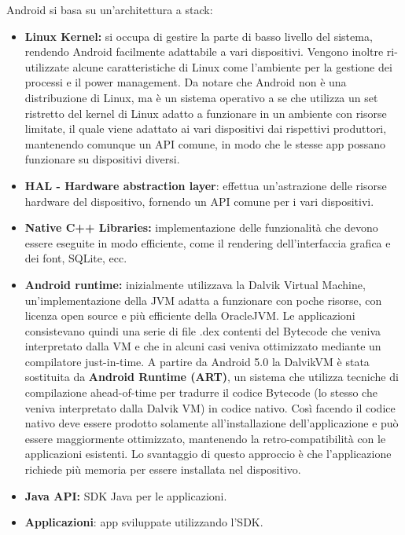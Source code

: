 Android si basa su un'architettura a stack:

\begin{itemize}
	\item \textbf{Linux Kernel:} si occupa di gestire la parte di basso livello
		del sistema, rendendo Android facilmente adattabile a vari
		dispositivi. Vengono inoltre ri-utilizzate alcune caratteristiche di
		Linux come l'ambiente per la gestione dei processi e il power
		management. Da notare che Android non è una distribuzione di Linux, ma
		è un sistema operativo a se che utilizza un set ristretto del kernel
		di Linux adatto a funzionare in un ambiente con risorse limitate, il
		quale viene adattato ai vari dispositivi dai rispettivi produttori,
		mantenendo comunque un API comune, in modo che le stesse app possano
		funzionare su dispositivi diversi.
	\item
		\textbf{HAL - Hardware abstraction layer}: effettua un'astrazione
		delle risorse hardware del dispositivo, fornendo un API comune per i
		vari dispositivi.
	\item
		\textbf{Native C++ Libraries:} implementazione delle funzionalità che
		devono essere eseguite in modo efficiente, come il rendering
		dell'interfaccia grafica e dei font, SQLite, ecc.
	\item
		\textbf{Android runtime:} inizialmente utilizzava la Dalvik Virtual
		Machine, un'implementazione della JVM adatta a funzionare con poche
		risorse, con licenza open source e più efficiente della OracleJVM. Le
		applicazioni consistevano quindi una serie di file .dex contenti del
		Bytecode che veniva interpretato dalla VM e che in alcuni casi veniva
		ottimizzato mediante un compilatore just-in-time. A partire da Android
		5.0 la DalvikVM è stata sostituita da \textbf{Android Runtime (ART)},
		un sistema che utilizza tecniche di compilazione ahead-of-time per
		tradurre il codice Bytecode (lo stesso che veniva interpretato dalla
		Dalvik VM) in codice nativo. Così facendo il codice nativo deve essere
		prodotto solamente all'installazione dell'applicazione e può essere
		maggiormente ottimizzato, mantenendo la retro-compatibilità con le
		applicazioni esistenti. Lo svantaggio di questo approccio è che
		l'applicazione richiede più memoria per essere installata nel
		dispositivo.
	\item
		\textbf{Java API:} SDK Java per le applicazioni.
	\item
		\textbf{Applicazioni}: app sviluppate utilizzando l'SDK.
\end{itemize}


